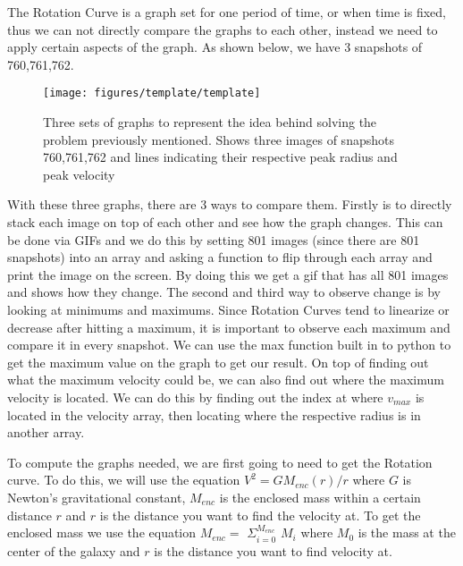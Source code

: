 \documentclass[modern]{aastex61}
\begin{document}
The Rotation Curve is a graph set for one period of time, or when time is fixed, thus we can not directly compare the graphs to each other, instead we need to apply certain aspects of the graph. As shown below, we have 3 snapshots of 760,761,762.
\begin{figure}[h!]
\begin{center}
\texttt{[image: figures/template/template]}
\caption{{Three sets of graphs to represent the idea behind solving the problem
previously mentioned. Shows three images of snapshots 760,761,762 and
lines indicating their respective peak radius and peak velocity
{\label{435594}}%
}}
\end{center}
\end{figure}

With these three graphs, there are 3 ways to compare them. Firstly is to directly stack each image on top of each other and see how the graph changes. This can be done via GIFs and we do this by setting 801 images (since there are 801 snapshots) into an array and asking a function to flip through each array and print the image on the screen. By doing this we get a gif that has all 801 images and shows how they change. The second and third way to observe change is by looking at minimums and maximums. Since Rotation Curves tend to linearize or decrease after hitting a maximum, it is important to observe each maximum and compare it in every snapshot. We can use the max function built in to python to get the maximum value on the graph to get our result. On top of finding out what the maximum velocity could be, we can also find out where the maximum velocity is located. We can do this by finding out the index at where $v_{max}$ is located in the velocity array, then locating where the respective radius is in another array. 

To compute the graphs needed, we are first going to need to get the Rotation curve. To do this, we will use the equation $V^2=GM_{enc}(r)/r$ where $G$ is Newton's gravitational constant, $M_{enc}$ is the enclosed mass within a certain distance $r$ and $r$ is the distance you want to find the velocity at. To get the enclosed mass we use the equation $M_{enc}=$ $\Sigma_{i=0}^{M_{enc}}$ $M_i$ where $M_0$ is the mass at the center of the galaxy and $r$ is the distance you want to find velocity at.
\end{document}
